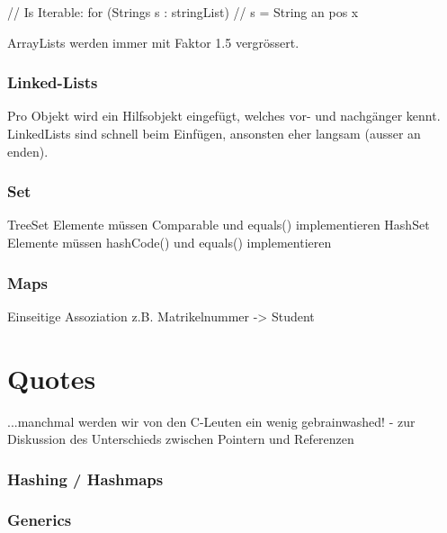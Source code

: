 	// Is Iterable:
	for (Strings s : stringList) {
		// s = String an pos x
	}
	
	ArrayLists werden immer mit Faktor 1.5 vergrössert.
	
\subsubsection{Linked-Lists}
	
	Pro Objekt wird ein Hilfsobjekt eingefügt, welches vor- und nachgänger kennt.
	LinkedLists sind schnell beim Einfügen, ansonsten eher langsam (ausser an enden).

\subsubsection{Set}

TreeSet
	Elemente müssen Comparable und equals() implementieren
HashSet
	Elemente müssen hashCode() und equals() implementieren

\subsubsection{Maps}

	Einseitige Assoziation z.B. Matrikelnummer -> Student

\section{Quotes}
	...manchmal werden wir von den C-Leuten ein wenig gebrainwashed!
	- zur Diskussion des Unterschieds zwischen Pointern und Referenzen

\subsubsection{Hashing / Hashmaps}
	



\subsubsection{Generics}

